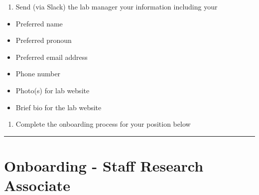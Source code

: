 \documentclass[]{book}
\providecommand{\tightlist}{%
  \setlength{\itemsep}{0pt}\setlength{\parskip}{0pt}}
\begin{document}
\begin{enumerate}
\def\labelenumi{\arabic{enumi}.}
\setcounter{enumi}{2}
\tightlist
\item
  Send (via Slack) the lab manager your information including your
\end{enumerate}

\begin{itemize}
\tightlist
\item
  Preferred name
\item
  Preferred pronoun
\item
  Preferred email address
\item
  Phone number
\item
  Photo(s) for lab website
\item
  Brief bio for the lab website
\end{itemize}

\begin{enumerate}
\def\labelenumi{\arabic{enumi}.}
\setcounter{enumi}{3}
\tightlist
\item
  Complete the onboarding process for your position below
\end{enumerate}

\begin{center}\rule{0.5\linewidth}{0.5pt}\end{center}

\hypertarget{onboarding---staff-research-associate}{%
\section{Onboarding - Staff Research Associate}\label{onboarding---staff-research-associate}}
\end{document}
